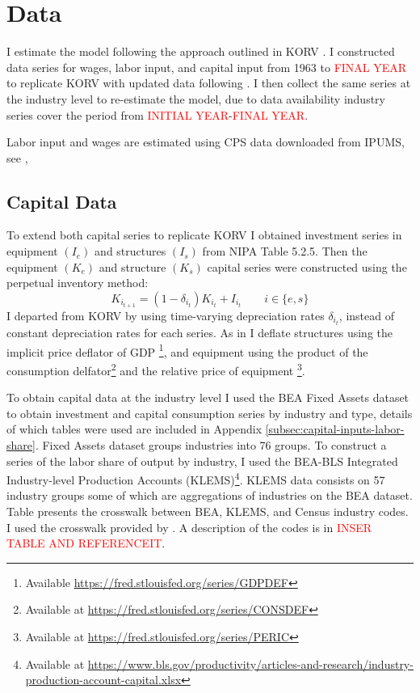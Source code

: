 \documentclass[12pt]{article}
\begin{document}
\section{Data}\label{sec:data}
I estimate the model following the approach outlined in KORV \citet{krusell2000capital}. I constructed data series for wages, labor input, and capital input from 1963 to \textcolor{red}{FINAL YEAR} to replicate KORV with updated data following \citet{ohanian2021revisiting}. I then collect the same series at the industry level to re-estimate the model, due to data availability industry series cover the period from \textcolor{red}{INITIAL YEAR}-\textcolor{red}{FINAL YEAR}.

Labor input and wages are estimated using CPS data downloaded from IPUMS, see \citet{flood2015integrated}, 

\subsection{Capital Data}\label{sec:capital_data}
To extend both capital series to replicate KORV I obtained investment series in equipment $(I_e)$ and structures $(I_s)$ from NIPA Table 5.2.5. Then the equipment $(K_e)$ and structure $(K_s)$ capital series were constructed using the perpetual inventory method:
\begin{equation}\label{eq:capital_law_motion}
  K_{i_{t+1}} = (1 - \delta_{i_t}) K_{i_{t}} + I_{i_{t}} \qquad i\in\{e, s\}
\end{equation}
\noindent
I departed from KORV by using time-varying depreciation rates $\delta_{i_t}$, instead of constant depreciation rates for each series. As in \citep{ohanian2021revisiting} I deflate structures using the implicit price deflator of GDP \footnote{Available \url{https://fred.stlouisfed.org/series/GDPDEF}}, and equipment using the product of the consumption delfator\footnote{Available at \url{https://fred.stlouisfed.org/series/CONSDEF}} and the relative price of equipment \footnote{Available at \url{https://fred.stlouisfed.org/series/PERIC}}. 

To obtain capital data at the industry level I used the BEA Fixed Assets dataset to obtain investment and capital consumption series by industry and type, details of which tables were used are included in Appendix \ref{subsec:capital-inputs-labor-share}. Fixed Assets dataset groups industries into 76 groups. To construct a series of the labor share of output by industry, I used the BEA-BLS Integrated Industry-level Production Accounts (KLEMS)\footnote{Available at \url{https://www.bls.gov/productivity/articles-and-research/industry-production-account-capital.xlsx}}. KLEMS data consists on 57 industry groups some of which are aggregations of industries on the BEA dataset. Table %
presents the crosswalk between BEA, KLEMS, and Census industry codes. I used the crosswalk provided by \citep{acemoglu2020unpacking}. A description of the codes is in \textcolor{red}{INSER TABLE AND REFERENCEIT}.
\end{document}
